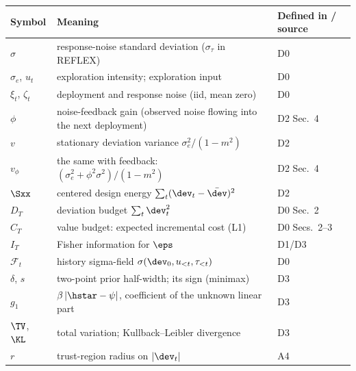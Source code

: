 \begin{center}\small
\begin{tabular}{@{}lp{4.9cm}l@{}}
\hline
Symbol & Meaning & Defined in / source\\
\hline
$\sigma$ & response-noise standard deviation ($\sigma_\tau$ in
  REFLEX) & D0\\
$\sigma_e$, $u_t$ & exploration intensity; exploration input & D0\\
$\xi_t$, $\zeta_t$ & deployment and response noise (iid, mean
  zero) & D0\\
$\phi$ & noise-feedback gain (observed noise flowing into the
  next deployment) & D2 Sec.~4\\
$v$ & stationary deviation variance $\sigma_e^2/(1-m^2)$ & D2\\
$v_\phi$ & the same with feedback:
  $(\sigma_e^2 + \phi^2\sigma^2)/(1-m^2)$ & D2 Sec.~4\\
$\Sxx$ & centered design energy
  $\sum_t (\dev_t - \bar{\dev})^2$ & D2\\
$D_T$ & deviation budget $\sum_t \dev_t^2$ & D0 Sec.~2\\
$C_T$ & value budget: expected incremental cost (L1)
  & D0 Secs.~2--3\\
$I_T$ & Fisher information for $\eps$ & D1/D3\\
$\mathcal{F}_t$ & history sigma-field
  $\sigma(\dev_0, u_{<t}, \tau_{<t})$ & D0\\
$\delta$, $s$ & two-point prior half-width; its sign (minimax)
  & D3\\
$g_1$ & $\beta\,\lvert \hstar - \psi \rvert$, coefficient of the
  unknown linear part & D3\\
$\TV$, $\KL$ & total variation; Kullback--Leibler divergence & D3\\
$r$ & trust-region radius on $\lvert \dev_t \rvert$ & A4\\
\hline
\end{tabular}
\end{center}

